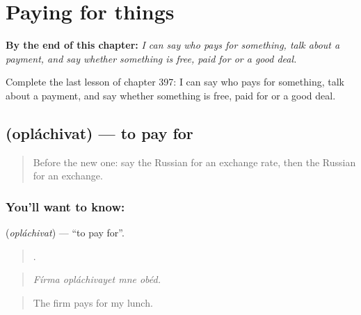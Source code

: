 
\chapter{Paying for things}
\label{ch:ru-paying-for-things}

\begin{chapteropening}
\textbf{By the end of this chapter:} \emph{I can say who pays for something, talk about a payment, and say whether something is free, paid for or a good deal.}

Complete the last lesson of chapter 397: I can say who pays for something, talk about a payment, and say whether something is free, paid for or a good deal.
\end{chapteropening}

\section[\texorpdfstring{\ru{оплачивать} (opláchivat)}{оплачивать (opláchivat)}]{ (opláchivat) — to pay for}

\label{lesson:RU-C397-oplachivat}



\begin{quote}
Before the new one: say the Russian for an exchange rate, then the Russian for an exchange.
\end{quote}

\subsection*{You'll want to know: }
\textbf{} (\emph{opláchivat}) — \textquotedblleft{}to pay for\textquotedblright{}.

\begin{quote}
   .
\end{quote}

\begin{quote}
\emph{Fírma opláchivayet mne obéd.}
\end{quote}

\begin{quote}
The firm pays for my lunch.
\end{quote}

